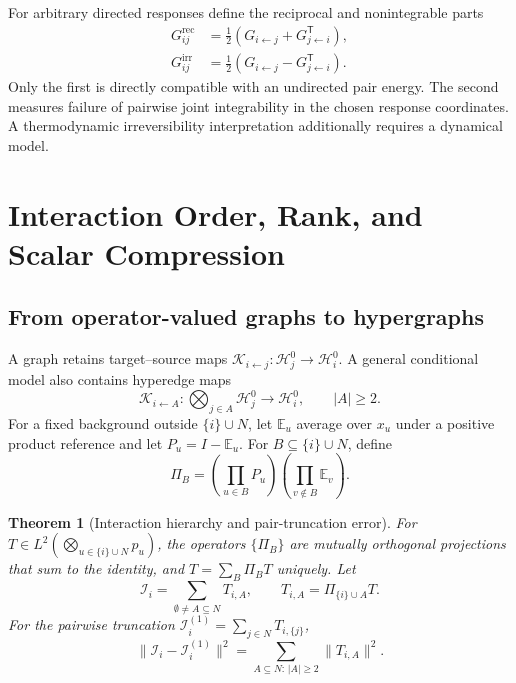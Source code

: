 \documentclass[10pt]{article}
\newtheorem{theorem}{Theorem}[section]
\theoremstyle{definition}
\theoremstyle{remark}
\newcommand{\BookChapter}[1]{\section{#1}}
\newcommand{\BookInsert}[1]{}
\newcommand{\BookChapterLabel}[1]{}
\newcommand{\BookSection}[1]{\subsection{#1}}
\begin{document}
For arbitrary directed responses define the reciprocal and nonintegrable parts
\begin{align}
G_{ij}^{\mathrm{rec}}
&=\frac12\left(G_{i\leftarrow j}+G_{j\leftarrow i}^{\mathsf T}\right),\\
G_{ij}^{\mathrm{irr}}
&=\frac12\left(G_{i\leftarrow j}-G_{j\leftarrow i}^{\mathsf T}\right).
\label{eq:reciprocal-irreversible}
\end{align}
Only the first is directly compatible with an undirected pair energy.  The second measures failure
of pairwise joint integrability in the chosen response coordinates.  A thermodynamic
irreversibility interpretation additionally requires a dynamical model.

\BookInsert{chapters/04_coda}
\BookChapter{Interaction Order, Rank, and Scalar Compression}
\BookChapterLabel{chap:book-order-rank}
\BookInsert{chapters/05_opening}
\BookInsert{chapters/05_three_variable_anova_primer}

\BookSection{From operator-valued graphs to hypergraphs}

A graph retains target--source maps
$\mathcal K_{i\leftarrow j}:\mathcal H_j^0\to\mathcal H_i^0$.  A general conditional model also
contains hyperedge maps
\begin{equation}
\mathcal K_{i\leftarrow A}:
\bigotimes_{j\in A}\mathcal H_j^0\longrightarrow\mathcal H_i^0,
\qquad |A|\geq2.
\label{eq:hyperedge-map}
\end{equation}
For a fixed background outside $\{i\}\cup N$, let $\mathbb E_u$ average over $x_u$ under a positive
product reference and let $P_u=I-\mathbb E_u$.  For $B\subseteq\{i\}\cup N$, define
\begin{equation}
\Pi_B=
\left(\prod_{u\in B}P_u\right)
\left(\prod_{v\notin B}\mathbb E_v\right).
\label{eq:hierarchical-projector}
\end{equation}

\begin{theorem}[Interaction hierarchy and pair-truncation error]
\label{thm:pair-truncation}
For $T\in L^2(\bigotimes_{u\in\{i\}\cup N}p_u)$, the operators $\{\Pi_B\}$ are mutually
orthogonal projections that sum to the identity, and $T=\sum_B\Pi_BT$ uniquely.  Let
\begin{equation}
\mathcal I_i=\sum_{\emptyset\ne A\subseteq N}T_{i,A},
\qquad
T_{i,A}=\Pi_{\{i\}\cup A}T.
\end{equation}
For the pairwise truncation $\mathcal I_i^{(1)}=\sum_{j\in N}T_{i,\{j\}}$,
\begin{equation}
\|\mathcal I_i-\mathcal I_i^{(1)}\|^2
=\sum_{A\subseteq N:\,|A|\geq2}\|T_{i,A}\|^2.
\label{eq:pair-truncation}
\end{equation}
\end{theorem}
\end{document}
